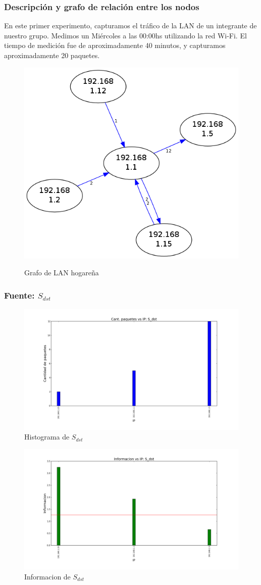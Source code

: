 \subsubsection{Descripción y grafo de relación entre los nodos}

En este primer experimento, capturamos el tráfico de la LAN de un integrante de nuestro grupo. Medimos un Miércoles a las 00:00hs utilizando la red Wi-Fi. El tiempo de medición fue de aproximadamente 40 minutos, y capturamos aproximadamente 20 paquetes.

\begin{figure}[H]
  \begin{center}
    \includegraphics[width=0.3\linewidth]{../imgs/red-hogarena_red.png}
    \label{fig:FedeGrafo}
    \caption{Grafo de LAN hogareña}
  \end{center}
\end{figure}

\subsubsection{Fuente: $S_{dst}$}

\begin{figure}[H]\centering
    \includegraphics[width=0.8\linewidth]{../imgs/red-hogarena_S_dst_hist.png}
    \caption{Histograma de $S_{dst}$}\label{fig:Fede-dst-hist}
\end{figure}

\begin{figure}[H]\centering
    \includegraphics[width=0.8\linewidth]{../imgs/red-hogarena_S_dst_info.png}
    \caption{Informacion de $S_{dst}$}\label{fig:Fede-dst-info}
\end{figure}

